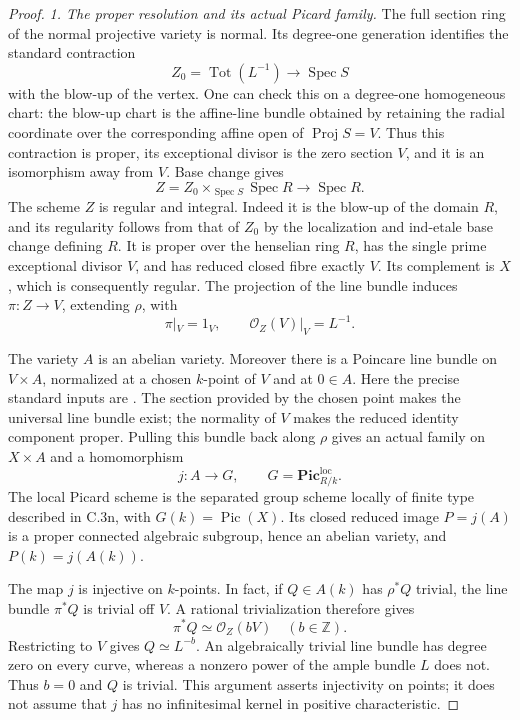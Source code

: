 \begin{proof}
\emph{1. The proper resolution and its actual
Picard family.}
The full section ring of the normal projective
variety is normal. Its degree-one generation
identifies the standard contraction
\[
 Z_0=\operatorname{Tot}(L^{-1})
          \longrightarrow\operatorname{Spec}S
\]
with the blow-up of the vertex. One can check
this on a degree-one homogeneous chart: the
blow-up chart is the affine-line bundle obtained
by retaining the radial coordinate over the
corresponding affine open of $\operatorname{Proj}S=V$.
Thus this contraction is proper, its exceptional
divisor is the zero section $V$, and it is an
isomorphism away from $V$. Base change gives
\[
 Z=Z_0\times_{\operatorname{Spec}S}\operatorname{Spec}R
                  \longrightarrow\operatorname{Spec}R.
\]
The scheme $Z$ is regular and integral. Indeed
it is the blow-up of the domain $R$, and its
regularity follows from that of $Z_0$ by the
localization and ind-etale base change defining
$R$. It is proper over the henselian ring $R$,
has the single prime exceptional divisor $V$,
and has reduced closed fibre exactly $V$.
Its complement is $X$, which is consequently
regular. The projection of the line bundle
induces $\pi:Z\to V$, extending $\rho$, with
\begin{equation}\label{eq:C3-cone-exceptional-restriction}
 \pi|_V=1_V,\qquad
             \mathcal O_Z(V)|_V=L^{-1}.
\end{equation}

The variety $A$ is an abelian variety. Moreover
there is a Poincare line bundle on $V\times A$,
normalized at a chosen $k$-point of $V$ and at
$0\in A$. Here the precise standard inputs are
\citet[Theorem 2.5(2), Exercise 4.3 with its answer,
and Theorem 5.4, author-version pp.~18, 27,
37--38, 65]{D_KleimanPicard2005v1}.
The section provided by the chosen point makes
the universal line bundle exist; the normality
of $V$ makes the reduced identity component
proper. Pulling this bundle back along $\rho$
gives an actual family on $X\times A$ and a
homomorphism
\[
           j:A\longrightarrow G,
           \qquad G=\mathbf{Pic}^{\mathrm{loc}}_{R/k}.
\]
The local Picard scheme is the separated group
scheme locally of finite type described in
C.3n, with $G(k)=\operatorname{Pic}(X)$.
Its closed reduced image $P=j(A)$ is a proper
connected algebraic subgroup, hence an abelian
variety, and $P(k)=j(A(k))$.

The map $j$ is injective on $k$-points.
In fact, if $Q\in A(k)$ has $\rho^*Q$ trivial,
the line bundle $\pi^*Q$ is trivial off $V$.
A rational trivialization therefore gives
\[
                         \pi^*Q\simeq\mathcal O_Z(bV)
                              \quad(b\in\mathbb Z).
\]
Restricting to $V$ gives $Q\simeq L^{-b}$.
An algebraically trivial line bundle has degree
zero on every curve, whereas a nonzero power
of the ample bundle $L$ does not. Thus $b=0$
and $Q$ is trivial. This argument asserts
injectivity on points; it does not assume
that $j$ has no infinitesimal kernel in
positive characteristic.


\end{proof}
